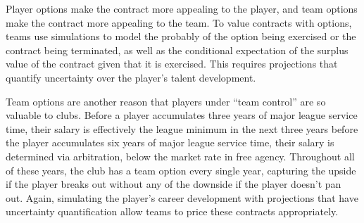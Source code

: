 \documentclass{article}
\begin{document}
        Player options make the contract more appealing to the player, and team options make the contract more appealing to the team. To value contracts with options, teams use simulations to model the probably of the option being exercised or the contract being terminated, as well as the conditional expectation of the surplus value of the contract given that it is exercised. This requires projections that quantify uncertainty over the player's talent development.

        Team options are another reason that players under ``team control'' are so valuable to clubs. Before a player accumulates three years of major league service time, their salary is effectively the league minimum in the next three years before the player accumulates six years of major league service time, their salary is determined via arbitration, below the market rate in free agency. Throughout all of these years, the club has a team option every single year, capturing the upside if the player breaks out without any of the downside if the player doesn't pan out. Again, simulating the player's career development with projections that have uncertainty quantification allow teams to price these contracts appropriately.
\end{document}
